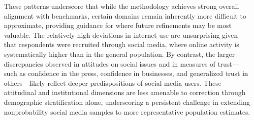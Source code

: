 These patterns underscore that while the methodology achieves strong overall alignment with benchmarks, certain domains remain inherently more difficult to approximate, providing guidance for where future refinements may be most valuable. The relatively high deviations in internet use are unsurprising given that respondents were recruited through social media, where online activity is systematically higher than in the general population. By contrast, the larger discrepancies observed in attitudes on social issues and in measures of trust—such as confidence in the press, confidence in businesses, and generalized trust in others—likely reflect deeper predispositions of social media users. These attitudinal and institutional dimensions are less amenable to correction through demographic stratification alone, underscoring a persistent challenge in extending nonprobability social media samples to more representative population estimates.












